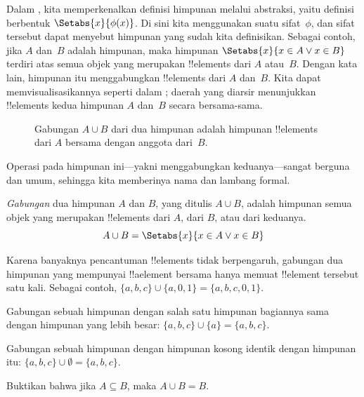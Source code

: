 \documentclass[../../../include/open-logic-section]{subfiles}
\begin{document}

\begin{explain}
Dalam , kita memperkenalkan definisi
himpunan melalui abstraksi, yaitu definisi berbentuk
$\Setabs{x}{\phi(x)}$. Di sini kita menggunakan suatu sifat~$\phi$,
dan sifat tersebut dapat menyebut himpunan yang sudah kita definisikan.
Sebagai contoh, jika $A$ dan~$B$ adalah himpunan, maka himpunan
$\Setabs{x}{x \in A \lor x \in B}$ terdiri atas semua objek yang
merupakan !!{element}s dari $A$ atau~$B$. Dengan kata lain, himpunan
itu menggabungkan !!{element}s dari $A$ dan~$B$. Kita dapat
memvisualisasikannya seperti dalam ; daerah yang
diarsir menunjukkan !!{element}s kedua himpunan $A$ dan~$B$ secara
bersama-sama.

\begin{figure}
  \caption{Gabungan $A \cup B$ dari dua himpunan adalah himpunan
   !!{element}s dari $A$ bersama dengan anggota dari~$B$.}
\end{figure}

Operasi pada himpunan ini---yakni menggabungkan keduanya---sangat
berguna dan umum, sehingga kita memberinya nama dan lambang formal.
\end{explain}

\begin{defn}[Gabungan]
\emph{Gabungan} dua himpunan $A$ dan $B$, yang ditulis $A \cup B$,
adalah himpunan semua objek yang merupakan !!{element}s dari $A$,
dari $B$, atau dari keduanya.
\[
A \cup B = \Setabs{x}{x \in A \lor x \in B}
\]
\end{defn}

\begin{ex}
Karena banyaknya pencantuman !!{element}s tidak berpengaruh, gabungan
dua himpunan yang mempunyai !!a{element} bersama hanya memuat
!!{element} tersebut satu kali. Sebagai contoh,
$\{ a, b, c\} \cup \{ a, 0, 1\} = \{a, b, c, 0, 1\}$.

Gabungan sebuah himpunan dengan salah satu himpunan bagiannya sama
dengan himpunan yang lebih besar: $\{a, b, c \} \cup \{a \} =
\{a, b, c\}$.

Gabungan sebuah himpunan dengan himpunan kosong identik dengan
himpunan itu: $\{a, b, c \} \cup \emptyset = \{a, b, c \}$.
\end{ex}

\begin{prob}
Buktikan bahwa jika $A \subseteq B$, maka $A \cup B = B$.
\end{prob}
\end{document}
